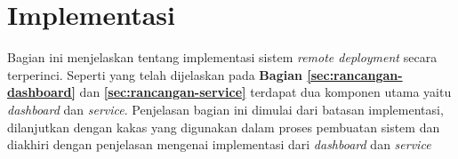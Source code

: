 \section{Implementasi}

Bagian ini menjelaskan tentang implementasi sistem \textit{remote deployment} secara terperinci. Seperti yang telah dijelaskan pada  \textbf{Bagian \ref{sec:rancangan-dashboard}} dan \textbf{\ref{sec:rancangan-service}} terdapat dua komponen utama yaitu \textit{dashboard} dan \textit{service}. Penjelasan bagian ini dimulai dari batasan implementasi, dilanjutkan dengan kakas yang digunakan dalam proses pembuatan sistem dan diakhiri dengan penjelasan mengenai implementasi dari \textit{dashboard} dan \textit{service}









\pagebreak

